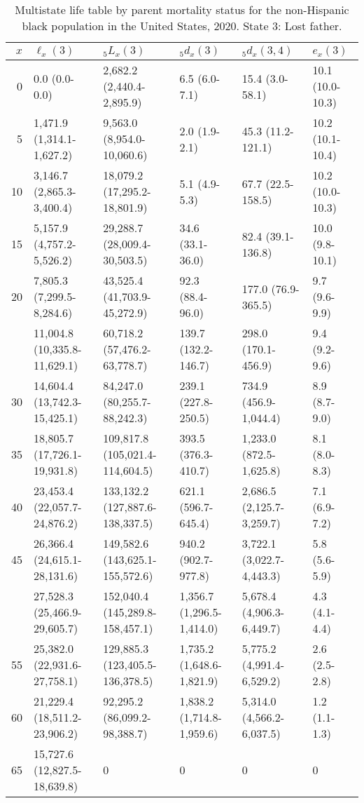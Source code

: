 \begin{table}

\caption{Multistate life table by parent mortality status for the non-Hispanic black population in the United States, 2020. State 3: Lost father.}
\centering
\begin{tabular}[t]{rlllll}
\toprule
$x$ & $\ell_x(3)$ & ${}_5 L_x(3)$ & ${}_5 d_x(3)$ & ${}_5 d_x(3,4)$ & $e_x(3)$\\
\midrule
0 & 0.0 (0.0-0.0) & 2,682.2 (2,440.4-2,895.9) & 6.5 (6.0-7.1) & 15.4 (3.0-58.1) & 10.1 (10.0-10.3)\\
5 & 1,471.9 (1,314.1-1,627.2) & 9,563.0 (8,954.0-10,060.6) & 2.0 (1.9-2.1) & 45.3 (11.2-121.1) & 10.2 (10.1-10.4)\\
10 & 3,146.7 (2,865.3-3,400.4) & 18,079.2 (17,295.2-18,801.9) & 5.1 (4.9-5.3) & 67.7 (22.5-158.5) & 10.2 (10.0-10.3)\\
15 & 5,157.9 (4,757.2-5,526.2) & 29,288.7 (28,009.4-30,503.5) & 34.6 (33.1-36.0) & 82.4 (39.1-136.8) & 10.0 (9.8-10.1)\\
20 & 7,805.3 (7,299.5-8,284.6) & 43,525.4 (41,703.9-45,272.9) & 92.3 (88.4-96.0) & 177.0 (76.9-365.5) & 9.7 (9.6-9.9)\\
\addlinespace
25 & 11,004.8 (10,335.8-11,629.1) & 60,718.2 (57,476.2-63,778.7) & 139.7 (132.2-146.7) & 298.0 (170.1-456.9) & 9.4 (9.2-9.6)\\
30 & 14,604.4 (13,742.3-15,425.1) & 84,247.0 (80,255.7-88,242.3) & 239.1 (227.8-250.5) & 734.9 (456.9-1,044.4) & 8.9 (8.7-9.0)\\
35 & 18,805.7 (17,726.1-19,931.8) & 109,817.8 (105,021.4-114,604.5) & 393.5 (376.3-410.7) & 1,233.0 (872.5-1,625.8) & 8.1 (8.0-8.3)\\
40 & 23,453.4 (22,057.7-24,876.2) & 133,132.2 (127,887.6-138,337.5) & 621.1 (596.7-645.4) & 2,686.5 (2,125.7-3,259.7) & 7.1 (6.9-7.2)\\
45 & 26,366.4 (24,615.1-28,131.6) & 149,582.6 (143,625.1-155,572.6) & 940.2 (902.7-977.8) & 3,722.1 (3,022.7-4,443.3) & 5.8 (5.6-5.9)\\
\addlinespace
50 & 27,528.3 (25,466.9-29,605.7) & 152,040.4 (145,289.8-158,457.1) & 1,356.7 (1,296.5-1,414.0) & 5,678.4 (4,906.3-6,449.7) & 4.3 (4.1-4.4)\\
55 & 25,382.0 (22,931.6-27,758.1) & 129,885.3 (123,405.5-136,378.5) & 1,735.2 (1,648.6-1,821.9) & 5,775.2 (4,991.4-6,529.2) & 2.6 (2.5-2.8)\\
60 & 21,229.4 (18,511.2-23,906.2) & 92,295.2 (86,099.2-98,388.7) & 1,838.2 (1,714.8-1,959.6) & 5,314.0 (4,566.2-6,037.5) & 1.2 (1.1-1.3)\\
65 & 15,727.6 (12,827.5-18,639.8) & 0 & 0 & 0 & 0\\
\bottomrule
\end{tabular}
\end{table}